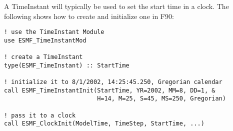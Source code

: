 
A TimeInstant will typically be used to set the start time in a
clock.  The following shows how to create and initialize one in F90:

\begin{verbatim}
! use the TimeInstant Module
use ESMF_TimeInstantMod

! create a TimeInstant
type(ESMF_TimeInstant) :: StartTime

! initialize it to 8/1/2002, 14:25:45.250, Gregorian calendar
call ESMF_TimeInstantInit(StartTime, YR=2002, MM=8, DD=1, &
                          H=14, M=25, S=45, MS=250, Gregorian)

! pass it to a clock
call ESMF_ClockInit(ModelTime, TimeStep, StartTime, ...)
\end{verbatim}
